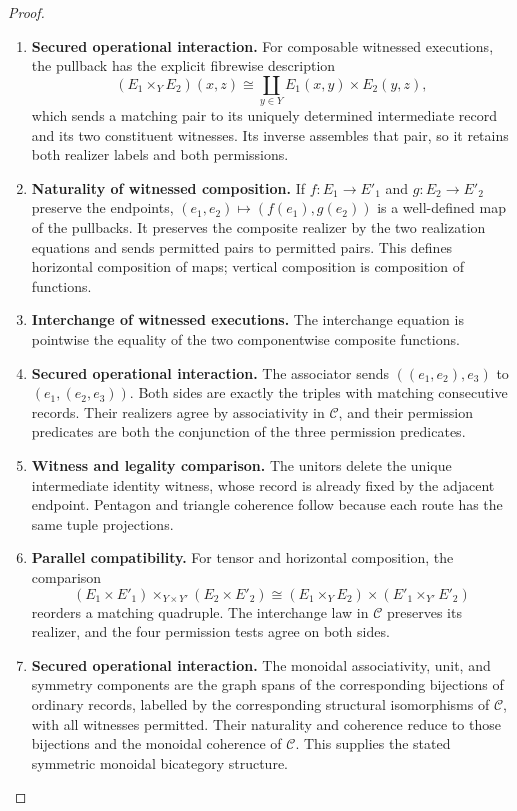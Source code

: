 \documentclass[11pt,a4paper]{article}
\numberwithin{equation}{section}
\theoremstyle{definition}
\theoremstyle{remark}
\theoremstyle{plain}
\begin{document}
\begin{proof}
\leavevmode
\begin{enumerate}[label=\textup{(\arabic*)},leftmargin=*,itemsep=4pt,topsep=3pt]
  \item \textbf{Secured operational interaction.} For composable witnessed executions, the pullback has the explicit
fibrewise description
\begin{equation}
\label{eq:institution-composite-witness-fibre}
 (E_1\times_YE_2)(x,z)
 \cong\coprod_{y\in Y}E_1(x,y)\times E_2(y,z),
\end{equation}
which sends a matching pair to its uniquely determined intermediate
record and its two constituent witnesses. Its inverse assembles that
pair, so it retains both realizer labels and both permissions.
  \item \textbf{Naturality of witnessed composition.} If $f:E_1\to E'_1$ and $g:E_2\to E'_2$ preserve the endpoints,
$(e_1,e_2)\mapsto(f(e_1),g(e_2))$ is a well-defined map of the
pullbacks. It preserves the composite realizer by the two realization
equations and sends permitted pairs to permitted pairs. This defines
horizontal composition of maps; vertical composition is composition
of functions.
  \item \textbf{Interchange of witnessed executions.} The interchange equation is pointwise the equality
of the two componentwise composite functions.
  \item \textbf{Secured operational interaction.} The associator sends $((e_1,e_2),e_3)$ to $(e_1,(e_2,e_3))$. Both sides are exactly the triples with matching consecutive records. Their realizers agree by associativity in $\mathcal C$, and their
permission predicates are both the conjunction of the three
permission predicates.
  \item \textbf{Witness and legality comparison.} The unitors delete the unique intermediate
identity witness, whose record is already fixed by the adjacent
endpoint. Pentagon and triangle coherence follow because each
route has the same tuple projections.
  \item \textbf{Parallel compatibility.} For tensor and horizontal composition, the comparison
\[
 (E_1\times E'_1)\times_{Y\times Y'}(E_2\times E'_2)
 \cong (E_1\times_YE_2)\times(E'_1\times_{Y'}E'_2)
\]
reorders a matching quadruple. The interchange law in $\mathcal C$
preserves its realizer, and the four permission tests agree on both
sides.
  \item \textbf{Secured operational interaction.} The monoidal associativity, unit, and symmetry components
are the graph spans of the corresponding bijections of ordinary
records, labelled by the corresponding structural isomorphisms
of $\mathcal C$, with all witnesses permitted. Their naturality
and coherence reduce to those bijections and the monoidal coherence
of $\mathcal C$. This supplies the stated symmetric monoidal
bicategory structure.
\end{enumerate}
\end{proof}
\end{document}
